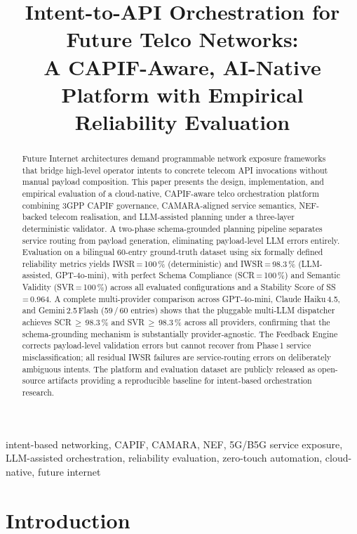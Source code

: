 \documentclass[conference]{IEEEtran}
\title{Intent-to-API Orchestration for Future Telco Networks:\\
A CAPIF-Aware, AI-Native Platform with Empirical\\
Reliability Evaluation}
\author{
\IEEEauthorblockN{T\"{u}rkan Do\u{g}a Durak}
\IEEEauthorblockA{
Centre Tecnol\`{o}gic de Telecomunicacions de Catalunya (CTTC)\\
Castelldefels, Spain\\
\texttt{turkandoga.durak@cttc.es}
}
}
\begin{document}
\maketitle

\begin{abstract}
Future Internet architectures demand programmable network exposure
frameworks that bridge high-level operator intents to concrete telecom API
invocations without manual payload composition. This paper presents
the design, implementation, and empirical evaluation of a cloud-native,
CAPIF-aware telco orchestration platform combining 3GPP CAPIF governance,
CAMARA-aligned service semantics, NEF-backed telecom realisation, and
LLM-assisted planning under a three-layer deterministic validator.
A two-phase schema-grounded planning pipeline separates service routing
from payload generation, eliminating payload-level LLM errors entirely.
Evaluation on a bilingual 60-entry ground-truth dataset using six formally
defined reliability metrics yields IWSR\,=\,100\,\% (deterministic) and
IWSR\,=\,98.3\,\% (LLM-assisted, GPT-4o-mini), with perfect Schema
Compliance (SCR\,=\,100\,\%) and Semantic Validity (SVR\,=\,100\,\%)
across all evaluated configurations and a Stability Score of SS\,=\,0.964.
A complete multi-provider comparison across GPT-4o-mini, Claude Haiku\,4.5, and
Gemini\,2.5\,Flash (59\,/\,60 entries) shows that the pluggable multi-LLM
dispatcher achieves SCR\,$\geq$\,98.3\,\% and SVR\,$\geq$\,98.3\,\% across all
providers, confirming that the schema-grounding mechanism is substantially
provider-agnostic.
The Feedback Engine corrects payload-level validation errors but cannot recover
from Phase\,1 service misclassification; all residual IWSR failures are
service-routing errors on deliberately ambiguous intents.
The platform and evaluation dataset are publicly released as open-source
artifacts providing a reproducible baseline for intent-based orchestration
research.
\end{abstract}

\begin{IEEEkeywords}
intent-based networking, CAPIF, CAMARA, NEF, 5G/B5G service exposure,
LLM-assisted orchestration, reliability evaluation, zero-touch automation,
cloud-native, future internet
\end{IEEEkeywords}

\section{Introduction}
\end{document}
